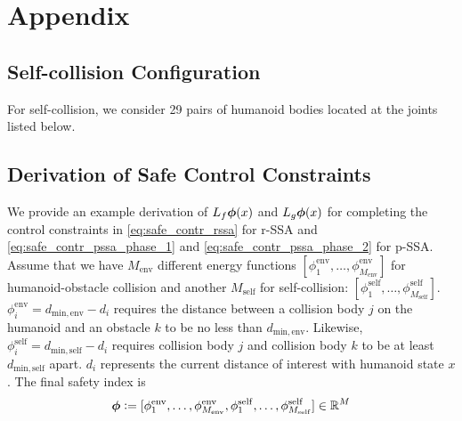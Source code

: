 \newpage
\onecolumn
\section{Appendix}

\subsection{Self-collision Configuration}\label{append:self_collision}

For self-collision, we consider 29 pairs of humanoid bodies located at the joints listed below.



\subsection{Derivation of Safe Control Constraints}\label{append:safe_control_constraint}

We provide an example derivation of $L_f\bm{\phi}(x)$ and $L_g\bm{\phi}(x)$ for completing the control constraints in \eqref{eq:safe_contr_rssa} for r-SSA and \eqref{eq:safe_contr_pssa_phase_1} and \eqref{eq:safe_contr_pssa_phase_2} for p-SSA.
Assume that we have $M_\mathrm{env}$ different energy functions $[\phi^\mathrm{env}_1,\dots,\phi^\mathrm{env}_{M_\mathrm{env}}]$ for humanoid-obstacle collision and another $M_\mathrm{self}$ for self-collision: $[\phi^\mathrm{self}_1,\dots,\phi^\mathrm{self}_{M_\mathrm{self}}]$.
$\phi^\mathrm{env}_i=d_\mathrm{min,env}-d_i$ requires the distance between a collision body $j$ on the humanoid and an obstacle $k$ to be no less than $d_\mathrm{min,env}$.
Likewise, $\phi^\mathrm{self}_{i} = d_\mathrm{min,self}-d_i$ requires collision body $j$ and collision body $k$ to be at least $d_\mathrm{min,self}$ apart.
$d_i$ represents the current distance of interest with humanoid state $x$.
The final safety index is
\begin{equation}    
\bm{\phi}\vcentcolon=[\phi^\mathrm{env}_1,\dots,\phi^\mathrm{env}_{M_\mathrm{env}},\phi^\mathrm{self}_1,\dots,\phi^\mathrm{self}_{M_\mathrm{self}}]\in\mathbb{R}^M
\end{equation}

